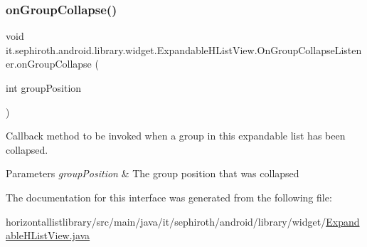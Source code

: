 \subsubsection{\texorpdfstring{on\+Group\+Collapse()}{onGroupCollapse()}}
{\footnotesize\ttfamily void it.\+sephiroth.\+android.\+library.\+widget.\+Expandable\+H\+List\+View.\+On\+Group\+Collapse\+Listener.\+on\+Group\+Collapse (\begin{DoxyParamCaption}\item[{int}]{group\+Position }\end{DoxyParamCaption})}

Callback method to be invoked when a group in this expandable list has been collapsed.


\begin{DoxyParams}{Parameters}
{\em group\+Position} & The group position that was collapsed \\
\hline
\end{DoxyParams}


The documentation for this interface was generated from the following file\+:\begin{DoxyCompactItemize}
\item 
horizontallistlibrary/src/main/java/it/sephiroth/android/library/widget/\hyperlink{_expandable_h_list_view_8java}{Expandable\+H\+List\+View.\+java}\end{DoxyCompactItemize}
